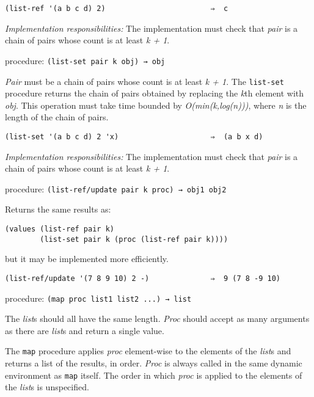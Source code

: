 \begin{verbatim}
(list-ref '(a b c d) 2)                        ⇒  c
\end{verbatim}

\emph{Implementation responsibilities:} The implementation must check
that \emph{pair} is a chain of pairs whose count is at least \emph{k +
1}.

procedure: \texttt{(list-set\ pair\ k\ obj)\ →\ obj}

\emph{Pair} must be a chain of pairs whose count is at least \emph{k +
1}. The \texttt{list-set} procedure returns the chain of pairs obtained
by replacing the \emph{k}th element with \emph{obj}. This operation must
take time bounded by \emph{O(min(k,log(n)))}, where \emph{n} is the
length of the chain of pairs.

\begin{verbatim}
(list-set '(a b c d) 2 'x)                     ⇒  (a b x d)
\end{verbatim}

\emph{Implementation responsibilities:} The implementation must check
that \emph{pair} is a chain of pairs whose count is at least \emph{k +
1}.

procedure: \texttt{(list-ref/update\ pair\ k\ proc)\ →\ obj1\ obj2}

Returns the same results as:

\begin{verbatim}
(values (list-ref pair k) 
        (list-set pair k (proc (list-ref pair k))))
\end{verbatim}

but it may be implemented more efficiently.

\begin{verbatim}
(list-ref/update '(7 8 9 10) 2 -)              ⇒  9 (7 8 -9 10)
\end{verbatim}

procedure: \texttt{(map\ proc\ list1\ list2\ ...)\ →\ list}

The \emph{list}s should all have the same length. \emph{Proc} should
accept as many arguments as there are \emph{list}s and return a single
value.

The \texttt{map} procedure applies \emph{proc} element-wise to the
elements of the \emph{list}s and returns a list of the results, in
order. \emph{Proc} is always called in the same dynamic environment as
\texttt{map} itself. The order in which \emph{proc} is applied to the
elements of the \emph{list}s is unspecified.

